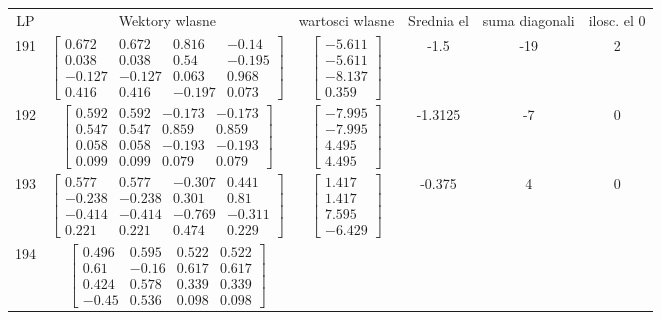 \documentclass[a4paper,12pt]{article}
\begin{document}
\bgroup {} \vspace{0.2in} \begin{tabular}{c c c c c c}
LP &Wektory wlasne & wartosci wlasne & Srednia el & suma diagonali & ilosc. el 0\\
191
&
$\begin{bmatrix} 0.672 & 0.672 & 0.816 & -0.14 \\ 0.038 & 0.038 & 0.54 & -0.195 \\ -0.127 & -0.127 & 0.063 & 0.968 \\ 0.416 & 0.416 & -0.197 & 0.073 \end{bmatrix}$
&
$\begin{bmatrix} -5.611 \\ -5.611 \\ -8.137 \\ 0.359 \end{bmatrix}$
&
-1.5
&
-19
&
2
\\
192
&
$\begin{bmatrix} 0.592 & 0.592 & -0.173 & -0.173 \\ 0.547 & 0.547 & 0.859 & 0.859 \\ 0.058 & 0.058 & -0.193 & -0.193 \\ 0.099 & 0.099 & 0.079 & 0.079 \end{bmatrix}$
&
$\begin{bmatrix} -7.995 \\ -7.995 \\ 4.495 \\ 4.495 \end{bmatrix}$
&
-1.3125
&
-7
&
0
\\
193
&
$\begin{bmatrix} 0.577 & 0.577 & -0.307 & 0.441 \\ -0.238 & -0.238 & 0.301 & 0.81 \\ -0.414 & -0.414 & -0.769 & -0.311 \\ 0.221 & 0.221 & 0.474 & 0.229 \end{bmatrix}$
&
$\begin{bmatrix} 1.417 \\ 1.417 \\ 7.595 \\ -6.429 \end{bmatrix}$
&
-0.375
&
4
&
0
\\
194
&
$\begin{bmatrix} 0.496 & 0.595 & 0.522 & 0.522 \\ 0.61 & -0.16 & 0.617 & 0.617 \\ 0.424 & 0.578 & 0.339 & 0.339 \\ -0.45 & 0.536 & 0.098 & 0.098 \end{bmatrix}$

\end{tabular}
\end{document}
